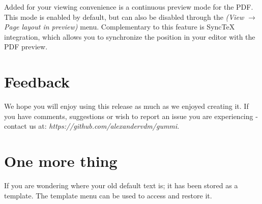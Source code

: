 \documentclass[11pt]{article}
\begin{document}
Added for your viewing convenience is a continuous preview mode for the PDF. This mode is enabled by default, but can also be disabled through the \emph{(View $\rightarrow$ Page layout in preview)} menu. Complementary to this feature is SyncTeX integration, which allows you to synchronize the position in your editor with the PDF preview. 

\section{Feedback}
We hope you will enjoy using this release as much as we enjoyed creating it. If you have comments, suggestions or wish to report an issue you are experiencing - contact us at: \emph{https://github.com/alexandervdm/gummi}.

\section{One more thing}
If you are wondering where your old default text is; it has been stored as a template. The template menu can be used to access and restore it. 
\end{document}
